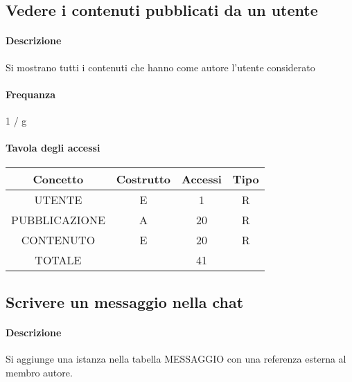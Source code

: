 \documentclass[a4paper,12pt]{report}
\begin{document}
\subsection{Vedere i contenuti pubblicati da un utente} \label{vedere_post_utente}
\paragraph{Descrizione} Si mostrano tutti i contenuti che hanno come autore l'utente considerato
\paragraph{Frequanza} 1 / g
\begin{table}[H]
\paragraph{Tavola degli accessi\newline}
\begin{tabular}{|c|c|c|c|}
\hline
Concetto      & Costrutto & Accessi & Tipo \\ \hline
UTENTE        & E         & 1       & R    \\ \hline
PUBBLICAZIONE & A         & 20      & R    \\ \hline
CONTENUTO     & E         & 20      & R    \\ \hline
TOTALE        &           & 41      &      \\ \hline
\end{tabular}
\end{table}
\subsection{Scrivere un messaggio nella chat} \label{scrivere_messaggio}
\paragraph{Descrizione} Si aggiunge una istanza nella tabella MESSAGGIO con una referenza esterna al membro autore.
\end{document}

